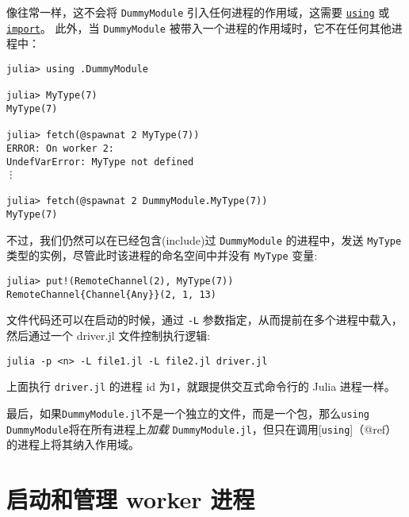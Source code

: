 像往常一样，这不会将 \texttt{DummyModule} 引入任何进程的作用域，这需要 \hyperlink{169458112978175560}{\texttt{using}} 或 \hyperlink{16252475688663093021}{\texttt{import}}。 此外，当 \texttt{DummyModule} 被带入一个进程的作用域时，它不在任何其他进程中：




\begin{verbatim}
julia> using .DummyModule

julia> MyType(7)
MyType(7)

julia> fetch(@spawnat 2 MyType(7))
ERROR: On worker 2:
UndefVarError: MyType not defined
⋮

julia> fetch(@spawnat 2 DummyModule.MyType(7))
MyType(7)
\end{verbatim}



不过，我们仍然可以在已经包含(include)过 \texttt{DummyModule} 的进程中，发送 \texttt{MyType} 类型的实例，尽管此时该进程的命名空间中并没有 \texttt{MyType} 变量:




\begin{verbatim}
julia> put!(RemoteChannel(2), MyType(7))
RemoteChannel{Channel{Any}}(2, 1, 13)
\end{verbatim}



文件代码还可以在启动的时候，通过 \texttt{-L} 参数指定，从而提前在多个进程中载入，然后通过一个 driver.jl 文件控制执行逻辑:




\begin{lstlisting}
julia -p <n> -L file1.jl -L file2.jl driver.jl
\end{lstlisting}



上面执行 \texttt{driver.jl} 的进程 id 为1，就跟提供交互式命令行的 Julia 进程一样。



最后，如果\texttt{DummyModule.jl}不是一个独立的文件，而是一个包，那么\texttt{using DummyModule}将在所有进程上\emph{加载} \texttt{DummyModule.jl}，但只在调用[\texttt{using}]（@ref）的进程上将其纳入作用域。



\hypertarget{5057018227750534701}{}


\section{启动和管理 worker 进程}



